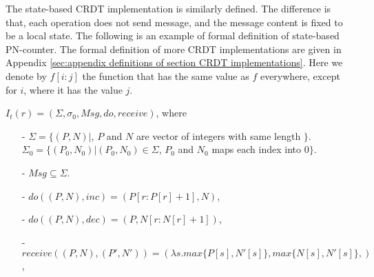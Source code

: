The state-based CRDT implementation is similarly defined. The difference is that, each operation does not send message, and the message content is fixed to be a local state. The following is an example of formal definition of state-based PN-counter. The formal definition of more CRDT implementations are given in Appendix \ref{sec:appendix definitions of section CRDT implementations}. Here we denote by $f[i:j]$ the function that has the same value as $f$ everywhere, except for $i$, where it has the value $j$. %

\begin{example}
\label{definition:formal definition of state-based PN-counter}
$I_t(r) = (\Sigma, \sigma_0, \mathit{Msg}, \mathit{do},\mathit{receive})$, where

\begin{itemize}
\setlength{\itemsep}{0.5pt}
\item[-] $\Sigma = \{ (P,N) \vert$, $P$ and $N$ are vector of integers with same length $\}$. $\Sigma_0 = \{ (P_0,N_0) \vert (P_0,N_0) \in \Sigma$, $P_0$ and $N_0$ maps each index into $0 \}$.

\item[-] $\mathit{Msg} \subseteq \Sigma$.

\item[-] $\mathit{do}((P,N),\mathit{inc}) = (P[r:P[r]+1],N)$,

\item[-] $\mathit{do}((P,N),\mathit{dec}) = (P,N[r:N[r]+1])$,

\item[-] $\mathit{receive}((P,N),(P',N')) = (\lambda s. \mathit{max}\{  P[s], N'[s] \}, \mathit{max}\{  N[s], N'[s] \},)$,
\end{itemize}
\end{example}
































